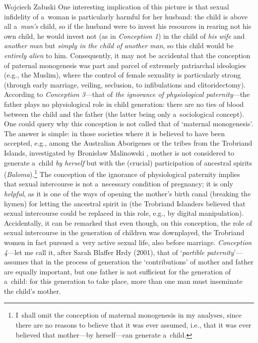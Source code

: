 \begin{artengenv}{Wojciech Załuski}
 One interesting implication of this picture is that sexual infidelity of a~woman is particularly harmful for her husband: the child is above all a~\textit{man's} child, so if the husband were to invest his resources in rearing not his own child, he would invest not (as in \textit{Conception 1}) in the child of \textit{his wife} and \textit{another man} but \textit{simply in the child of another man}, so this child would be \textit{entirely alien} to him. Consequently, it may not be accidental that the conception of paternal monogenesis was part and parcel of extremely patriarchal ideologies (e.g., the Muslim), where the control of female sexuality is particularly strong (through early marriage, veiling, seclusion, to infibulations and clitoridectomy). According to \textit{Conception 3}---that of \textit{the ignorance of physiological paternity}---the father plays no physiological role in child generation: there are no ties of blood between the child and the father (the latter being only a~sociological concept). One could query why this conception is not called that of ‘maternal monogenesis'. The answer is simple: in those societies where it is believed to have been accepted, e.g., among the Australian Aborigenes or the tribes from the Trobriand Islands, investigated by Bronisław Malinowski 
\parencites*[][]{malinowski_family_1913}[][]{malinowski_father_1927}[][]{malinowski_sex_1927}, %
 mother is not considered to generate a~child \textit{by herself} but with the (crucial) participation of ancestral spirits (\textit{Baloma}).\footnote{I~shall omit the conception of maternal monogenesis in my analyses, since there are no reasons to believe that it was ever assumed, i.e., that it was ever believed that mother---by herself---can generate a~child.} The conception of the ignorance of physiological paternity implies that sexual intercourse is not a~necessary condition of pregnancy; it is only \textit{helpful}, as it is one of the ways of opening the mother's birth canal (breaking the hymen) for letting the ancestral spirit in (the Trobriand Islanders believed that sexual intercourse could be replaced in this role, e.g., by digital manipulation). Accidentally, it can be remarked that even though, on this conception, the role of sexual intercourse in the generation of children was downplayed, the Trobriand women in fact pursued a~very active sexual life, also before marriage. \textit{Conception 4}---let me call it, after Sarah Blaffer Hrdy (2001), that of ‘\textit{partible paternity}'---assumes that in the process of generation the ‘contributions' of mother and father are equally important, but one father is not sufficient for the generation of a~child: for this generation to take place, more than one man must inseminate the child's mother.


\end{artengenv}
